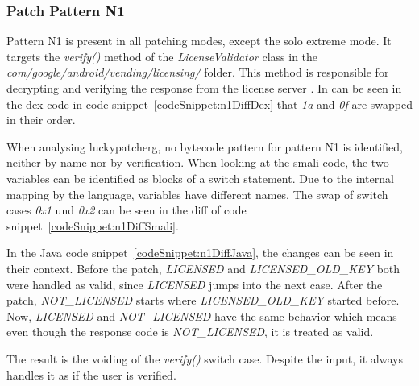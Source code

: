 \subsubsection{Patch Pattern N1}
Pattern N1 is present in all patching modes, except the solo extreme mode.
It targets the \textit{verify()} method of the \textit{LicenseValidator} class in the \textit{com/google/android/vending/licensing/} folder.
This method is responsible for decrypting and verifying the response from the license server \cite{developersLicensingReference}.
\newline
In can be seen in the dex code in code snippet~\ref{codeSnippet:n1DiffDex} that \textit{1a} and \textit{0f} are swapped in their order.
\newline

When analysing \gls{luckypatcherg}, no bytecode pattern for pattern N1 is identified, neither by name nor by verification.
\newline
When looking at the smali code, the two variables can be identified as blocks of a switch statement.
Due to the internal mapping by the language, variables have different names.
The swap of switch cases \textit{0x1} und \textit{0x2} can be seen in the diff of code snippet~\ref{codeSnippet:n1DiffSmali}.
\newline

In the Java code snippet~\ref{codeSnippet:n1DiffJava}, the changes can be seen in their context.
Before the patch, \textit{LICENSED} and \textit{LICENSED\_OLD\_KEY} both were handled as valid, since \textit{LICENSED} jumps into the next case.
After the patch, \textit{NOT\_LICENSED} starts where \textit{LICENSED\_OLD\_KEY} started before.
Now, \textit{LICENSED} and \textit{NOT\_LICENSED} have the same behavior which means even though the response code is \textit{NOT\_LICENSED}, it is treated as valid.
\newline

The result is the voiding of the \textit{verify()} switch case.
Despite the input, it always handles it as if the user is verified.

